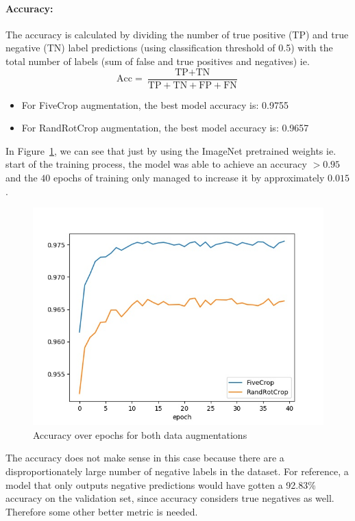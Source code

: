 \documentclass{article}
\begin{document}
\paragraph{Accuracy:} The accuracy is calculated by dividing the number of true positive (TP) and true negative (TN) label predictions (using classification threshold of 0.5) with the total number of labels (sum of false and true positives and negatives) ie.
\begin{equation*}
    \text{Acc} = \frac{\text{TP} + \text{TN}}{\text{TP} + \text{TN} + \text{FP} + \text{FN}}
\end{equation*}
\begin{itemize}
    \item For FiveCrop augmentation, the best model accuracy is: 0.9755
    \item For RandRotCrop augmentation, the best model accuracy is: 0.9657
\end{itemize}

In Figure~\ref{fig:acc}, we can see that just by using the ImageNet pretrained weights ie. start of the training process, the model was able to achieve an accuracy $> 0.95$ and the $40$ epochs of training only managed to increase it by approximately $0.015$.
\begin{figure}[H]
    \centering
    \includegraphics[width=.7\textwidth]{accuracy.jpg}
    \caption{Accuracy over epochs for both data augmentations}
    \label{fig:acc}
\end{figure}

The accuracy does not make sense in this case because there are a disproportionately large number of negative labels in the dataset. For reference, a model that only outputs negative predictions would have gotten a 92.83\% accuracy on the validation set, since accuracy considers true negatives as well. Therefore some other better metric is needed.
\end{document}
